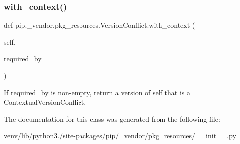 \subsubsection{\texorpdfstring{with\+\_\+context()}{with\_context()}}
{\footnotesize\ttfamily def pip.\+\_\+vendor.\+pkg\+\_\+resources.\+Version\+Conflict.\+with\+\_\+context (\begin{DoxyParamCaption}\item[{}]{self,  }\item[{}]{required\+\_\+by }\end{DoxyParamCaption})}

\begin{DoxyVerb}If required_by is non-empty, return a version of self that is a
ContextualVersionConflict.
\end{DoxyVerb}
 

The documentation for this class was generated from the following file\+:\begin{DoxyCompactItemize}
\item 
venv/lib/python3./site-\/packages/pip/\+\_\+vendor/pkg\+\_\+resources/\hyperlink{venv_2lib_2python3_89_2site-packages_2pip_2__vendor_2pkg__resources_2____init_____8py}{\+\_\+\+\_\+init\+\_\+\+\_\+.\+py}\end{DoxyCompactItemize}
